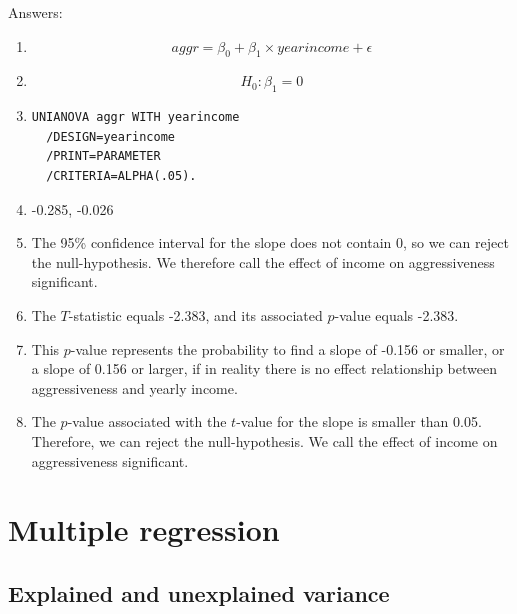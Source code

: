 \documentclass[]{report}\usepackage[]{graphicx}\usepackage[]{color}
\begin{document}
Answers:

\begin{enumerate}
\item

\begin{equation}
aggr = \beta_0 + \beta_1 \times yearincome + \epsilon
\end{equation}

\item
\begin{equation}
H_0 : \beta_1 = 0
\end{equation}


\item
\begin{verbatim}
UNIANOVA aggr WITH yearincome
  /DESIGN=yearincome
  /PRINT=PARAMETER
  /CRITERIA=ALPHA(.05).
\end{verbatim}




\item

 -0.285, -0.026



\item The 95\% confidence interval for the slope does not contain 0, so we can reject the null-hypothesis. We therefore call the effect of income on aggressiveness significant.

\item The $T$-statistic equals -2.383, and its associated $p$-value equals -2.383.

\item This $p$-value represents the probability to find a slope of -0.156 or smaller, or a slope of 0.156 or larger, if in reality there is no effect relationship between aggressiveness and yearly income.

\item The $p$-value associated with the $t$-value for the slope is smaller than 0.05. Therefore, we can reject the null-hypothesis. We  call the effect of income on aggressiveness significant.


\end{enumerate}





\chapter{Multiple regression}\label{chap:multip}


\section{Explained and unexplained variance}
\end{document}
